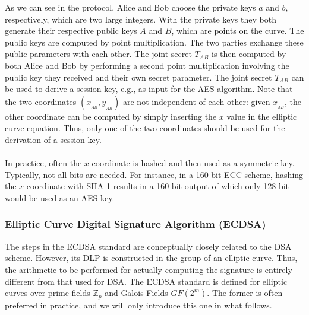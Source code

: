\documentclass[11pt, a4paper]{article}
\begin{document}
As we can see in the protocol, Alice and Bob choose the private keys $a$ and $b$, respectively, which are two large integers. With the private keys they both generate their respective public keys $A$ and $B$, which are points on the curve. The public keys are computed by point multiplication. The two parties exchange these public parameters with each other. The joint secret $T_{AB}$ is then computed by both Alice and Bob by performing a second point multiplication involving the public key they received and their own secret parameter. The joint secret $T_{AB}$ can be used to derive a session key, e.g., as input for the AES algorithm. Note that the two coordinates $(x_{_{AB}},y_{_{AB}})$ are not independent of each other: given $x_{_{AB}}$, the other coordinate can be computed by simply inserting the $x$ value in the elliptic curve equation. Thus, only one of the two coordinates should be used for the derivation of a session key.\\\\
In practice, often the $x$-coordinate is hashed and then used as a symmetric key. Typically, not all bits are needed. For instance, in a 160-bit ECC scheme, hashing the $x$-coordinate with SHA-1 results in a 160-bit output of which only 128 bit would be used as an AES key.

\newpage
\subsubsection{Elliptic Curve Digital Signature Algorithm (ECDSA)}
The steps in the ECDSA standard are conceptually closely related to the DSA scheme. However, its DLP is constructed in the group of an elliptic curve. Thus, the arithmetic to be performed for actually computing the signature is entirely different from that used for DSA. The ECDSA standard is defined for elliptic curves over prime fields $\mathbb{Z}_p$ and Galois Fields $GF(2^m)$. The former  is often preferred in practice, and we will only introduce this one in what follows.
\end{document}
